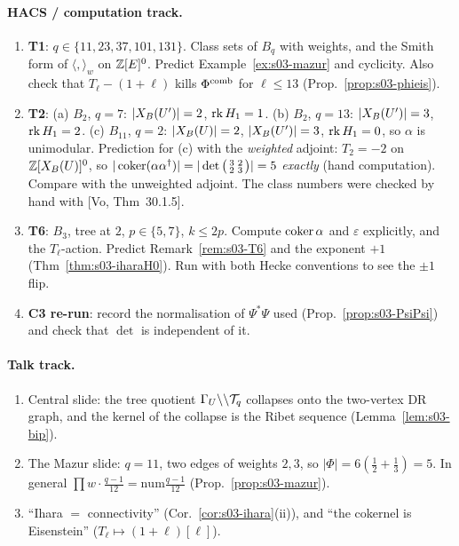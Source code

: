 \paragraph{HACS / computation track.}
\begin{enumerate}[label=H\arabic*.]
\item \textbf{T1}: $q\in\{11,23,37,101,131\}$. Class sets of $B_q$ with weights, and the Smith form of $\langle,\rangle_w$ on
  $\mathbb{Z}[E]^0$. Predict Example~\ref{ex:s03-mazur} and cyclicity. Also check that $T_\ell-(1+\ell)$ kills $\Phi^{\mathrm{comb}}$ for $\ell\le13$
  (Prop.~\ref{prop:s03-phieis}).
\item \textbf{T2}: (a) $B_2$, $q=7$: $|X_B(U')|=2$, $\operatorname{rk} H_1=1$. (b) $B_2$, $q=13$: $|X_B(U')|=3$, $\operatorname{rk} H_1=2$. (c) $B_{11}$, $q=2$:
  $|X_B(U)|=2$, $|X_B(U')|=3$, $\operatorname{rk} H_1=0$, so $\alpha$ is unimodular. Prediction for (c) with the \emph{weighted} adjoint: $T_2=-2$ on
  $\mathbb{Z}[X_B(U)]^0$, so $|\operatorname{coker}(\alpha\alpha^\dagger)|=|\det\big(\begin{smallmatrix}3&2\\2&3\end{smallmatrix}\big)|=5$ \emph{exactly}
  \stsketch{} (hand computation). Compare with the unweighted adjoint. The class numbers were checked by hand with [Vo,
  Thm~30.1.5].
\item \textbf{T6}: $B_3$, tree at $2$, $p\in\{5,7\}$, $k\le2p$. Compute $\operatorname{coker}\alpha$ and $\varepsilon$ explicitly, and the
  $T_\ell$-action. Predict Remark~\ref{rem:s03-T6} and the exponent $+1$ (Thm~\ref{thm:s03-iharaH0}). Run with both Hecke
  conventions to see the $\pm1$ flip.
\item \textbf{C3 re-run}: record the normalisation of $\Psi^*\Psi$ used (Prop.~\ref{prop:s03-PsiPsi}) and check that $\det$ is
  independent of it.
\end{enumerate}

\paragraph{Talk track.}
\begin{enumerate}[label=K\arabic*.]
\item Central slide: the tree quotient $\Gamma_U\backslash\backslash\mathcal{T}_q$ collapses onto the two-vertex DR graph, and the kernel of the collapse is the
  Ribet sequence (Lemma~\ref{lem:s03-bip}).
\item The Mazur slide: $q=11$, two edges of weights $2,3$, so $|\Phi|=6(\frac12+\frac13)=5$. In general
  $\prod w\cdot\frac{q-1}{12}=\mathrm{num}\frac{q-1}{12}$ (Prop.~\ref{prop:s03-mazur}).
\item ``Ihara $=$ connectivity'' (Cor.~\ref{cor:s03-ihara}(ii)), and ``the cokernel is Eisenstein''
  ($T_\ell\mapsto(1+\ell)[\ell]$).
\end{enumerate}

